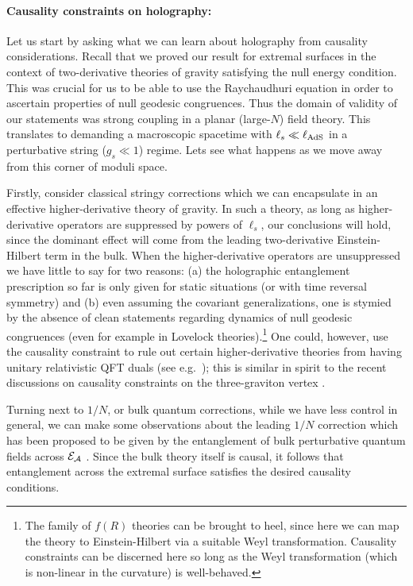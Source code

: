 \documentclass[12pt]{article}
\def\regA{{\cal A}}
\def\extr{{\cal E}_\regA}
\begin{document}
\paragraph{Causality constraints on holography:}
Let us start by asking what we can learn about holography from causality considerations. Recall that we proved our result for extremal surfaces in the context of two-derivative theories of gravity satisfying the null energy condition. This was crucial for us to be able to use the Raychaudhuri equation in order to ascertain properties of null geodesic congruences. Thus the domain of validity of our statements was strong coupling in a planar (large-$N$) field theory. This translates to demanding a macroscopic spacetime with $\ell_s \ll \ell_{\rm AdS}$ in a perturbative string  ($g_s \ll1$) regime. Lets see what happens as we move away from this corner of moduli space.

Firstly, consider classical stringy corrections which we can encapsulate in an effective higher-derivative theory of gravity. In such a theory, as long as higher-derivative operators are suppressed by powers of $\ell_s$, our conclusions will hold, since the dominant effect will come from the leading two-derivative Einstein-Hilbert term in the bulk.  When the  higher-derivative operators are unsuppressed we have little to say  for two reasons: 
(a) the holographic entanglement prescription so far is only  given for  static situations (or with time reversal symmetry) \cite{Dong:2013qoa,Camps:2013zua} and (b) even assuming the covariant generalizations, one is stymied by the absence of clean statements regarding dynamics of null geodesic congruences (even for example in Lovelock theories).\footnote{  The family of $f(R)$ theories can be brought to heel, since here we can map the theory to Einstein-Hilbert via a suitable Weyl transformation. Causality constraints can be discerned here so long as the Weyl transformation (which is non-linear in the curvature) is well-behaved.} One could, however, use the causality constraint to rule out certain higher-derivative theories from having unitary relativistic QFT duals (see e.g.\ \cite{Erdmenger:2014tba}); this is similar in spirit to the recent discussions on causality constraints on the three-graviton vertex \cite{Camanho:2014apa}.

Turning next to $1/N$, or bulk quantum corrections, while we have less control in general, we can make some observations about the leading $1/N$ correction which has been proposed to be given by the entanglement of bulk perturbative quantum fields across $\extr$ \cite{Faulkner:2013ana}. Since the bulk theory itself is causal, it follows that entanglement across the extremal surface satisfies the desired causality conditions. 
\end{document}
